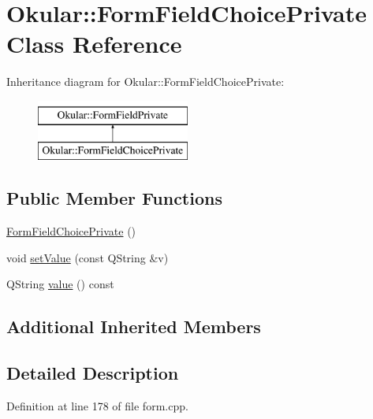 \hypertarget{classOkular_1_1FormFieldChoicePrivate}{\section{Okular\+:\+:Form\+Field\+Choice\+Private Class Reference}
\label{classOkular_1_1FormFieldChoicePrivate}
}
Inheritance diagram for Okular\+:\+:Form\+Field\+Choice\+Private\+:\begin{figure}[H]
\begin{center}
\leavevmode
\includegraphics[height=2.000000cm]{classOkular_1_1FormFieldChoicePrivate}
\end{center}
\end{figure}
\subsection*{Public Member Functions}
\begin{DoxyCompactItemize}
\item 
\hyperlink{classOkular_1_1FormFieldChoicePrivate_a64dff464e21567cd5ca9674d82e6ad62}{Form\+Field\+Choice\+Private} ()
\item 
void \hyperlink{classOkular_1_1FormFieldChoicePrivate_a617efb2e31c799183b389a532302a51c}{set\+Value} (const Q\+String \&v)
\item 
Q\+String \hyperlink{classOkular_1_1FormFieldChoicePrivate_a9e0734a416520cf24ff87b84d8a1ab52}{value} () const 
\end{DoxyCompactItemize}
\subsection*{Additional Inherited Members}


\subsection{Detailed Description}


Definition at line 178 of file form.\+cpp.



